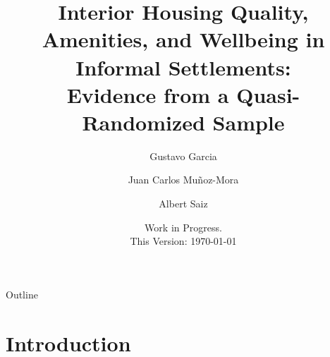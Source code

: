    

    \usepackage{booktabs}%
    \newcommand{\tabitem}{~~\llap{\textbullet}~~}

    \title{Interior Housing Quality, Amenities, and Wellbeing in Informal Settlements:  \\ 
    Evidence from a Quasi-Randomized Sample}
    
    \author[1]{Gustavo Garcia}
    \author[1]{Juan Carlos Muñoz-Mora}
    \author[2]{Albert Saiz}


    \date{Work in Progress. \\ This Version: \today}

\usepackage{graphicx}

   


    \maketitle
        \begin{abstract}
   
        \end{abstract}

Outline

\section{Introduction}
